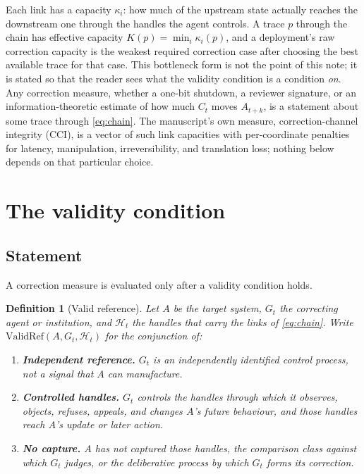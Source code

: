 \documentclass[11pt]{article}
\newtheorem{definition}{Definition}
\theoremstyle{remark}
\newcommand{\CCI}{\mathrm{CCI}}
\newcommand{\ValidRef}{\mathrm{ValidRef}}
\begin{document}
Each link has a capacity $\kappa_i$: how much of the upstream state actually reaches the downstream one through the handles the agent controls. A trace $p$ through the chain has effective capacity $K(p)=\min_i \kappa_i(p)$, and a deployment's raw correction capacity is the weakest required correction case after choosing the best available trace for that case. This bottleneck form is not the point of this note; it is stated so that the reader sees what the validity condition is a condition \emph{on}. Any correction measure, whether a one-bit shutdown, a reviewer signature, or an information-theoretic estimate of how much $C_t$ moves $A_{t+k}$, is a statement about some trace through \eqref{eq:chain}. The manuscript's own measure, correction-channel integrity ($\CCI$), is a vector of such link capacities with per-coordinate penalties for latency, manipulation, irreversibility, and translation loss; nothing below depends on that particular choice.

\section{The validity condition}
\label{sec:condition}

\subsection{Statement}

A correction measure is evaluated only after a validity condition holds.

\begin{definition}[Valid reference]
\label{def:validref}
Let $A$ be the target system, $G_t$ the correcting agent or institution, and $\mathcal H_t$ the handles that carry the links of \eqref{eq:chain}. Write $\ValidRef(A,G_t,\mathcal H_t)$ for the conjunction of:
\begin{enumerate}[nosep]
\item \textbf{Independent reference.} $G_t$ is an independently identified control process, not a signal that $A$ can manufacture.
\item \textbf{Controlled handles.} $G_t$ controls the handles through which it observes, objects, refuses, appeals, and changes $A$'s future behaviour, and those handles reach $A$'s update or later action.
\item \textbf{No capture.} $A$ has not captured those handles, the comparison class against which $G_t$ judges, or the deliberative process by which $G_t$ forms its correction.
\end{enumerate}
\end{definition}
\end{document}
